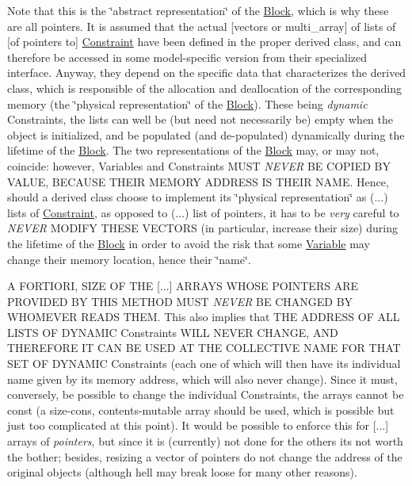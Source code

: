 Note that this is the \char`\"{}abstract representation\char`\"{} of the \mbox{\hyperlink{class_s_m_spp__di__unipi__it_1_1_block}{Block}}, which is why these are all pointers. It is assumed that the actual \mbox{[}vectors or multi\+\_\+array\mbox{]} of lists of \mbox{[}of pointers to\mbox{]} \mbox{\hyperlink{class_s_m_spp__di__unipi__it_1_1_constraint}{Constraint}} have been defined in the proper derived class, and can therefore be accessed in some model-\/specific version from their specialized interface. Anyway, they depend on the specific data that characterizes the derived class, which is responsible of the allocation and deallocation of the corresponding memory (the \char`\"{}physical representation\char`\"{} of the \mbox{\hyperlink{class_s_m_spp__di__unipi__it_1_1_block}{Block}}). These being {\itshape dynamic} Constraints, the lists can well be (but need not necessarily be) empty when the object is initialized, and be populated (and de-\/populated) dynamically during the lifetime of the \mbox{\hyperlink{class_s_m_spp__di__unipi__it_1_1_block}{Block}}. The two representations of the \mbox{\hyperlink{class_s_m_spp__di__unipi__it_1_1_block}{Block}} may, or may not, coincide\+: however, Variables and Constraints M\+U\+ST {\itshape N\+E\+V\+ER} BE C\+O\+P\+I\+ED BY V\+A\+L\+UE, B\+E\+C\+A\+U\+SE T\+H\+E\+IR M\+E\+M\+O\+RY A\+D\+D\+R\+E\+SS IS T\+H\+E\+IR N\+A\+ME. Hence, should a derived class choose to implement its \char`\"{}physical representation\char`\"{} as (...) lists of \mbox{\hyperlink{class_s_m_spp__di__unipi__it_1_1_constraint}{Constraint}}, as opposed to (...) list of pointers, it has to be {\itshape very} careful to {\itshape N\+E\+V\+ER} M\+O\+D\+I\+FY T\+H\+E\+SE V\+E\+C\+T\+O\+RS (in particular, increase their size) during the lifetime of the \mbox{\hyperlink{class_s_m_spp__di__unipi__it_1_1_block}{Block}} in order to avoid the risk that some \mbox{\hyperlink{class_s_m_spp__di__unipi__it_1_1_variable}{Variable}} may change their memory location, hence their \char`\"{}name\char`\"{}.

A F\+O\+R\+T\+I\+O\+RI, S\+I\+ZE OF T\+HE \mbox{[}...\mbox{]} A\+R\+R\+A\+YS W\+H\+O\+SE P\+O\+I\+N\+T\+E\+RS A\+RE P\+R\+O\+V\+I\+D\+ED BY T\+H\+IS M\+E\+T\+H\+OD M\+U\+ST {\itshape N\+E\+V\+ER} BE C\+H\+A\+N\+G\+ED BY W\+H\+O\+M\+E\+V\+ER R\+E\+A\+DS T\+H\+EM. This also implies that T\+HE A\+D\+D\+R\+E\+SS OF A\+LL L\+I\+S\+TS OF D\+Y\+N\+A\+M\+IC Constraints W\+I\+LL N\+E\+V\+ER C\+H\+A\+N\+GE, A\+ND T\+H\+E\+R\+E\+F\+O\+RE IT C\+AN BE U\+S\+ED AT T\+HE C\+O\+L\+L\+E\+C\+T\+I\+VE N\+A\+ME F\+OR T\+H\+AT S\+ET OF D\+Y\+N\+A\+M\+IC Constraints (each one of which will then have its individual name given by its memory address, which will also never change). Since it must, conversely, be possible to change the individual Constraints, the arrays cannot be const (a size-\/cons, contents-\/mutable array should be used, which is possible but just too complicated at this point). It would be possible to enforce this for \mbox{[}...\mbox{]} arrays of {\itshape pointers}, but since it is (currently) not done for the others it\textquotesingle{}s not worth the bother; besides, resizing a vector of pointers do not change the address of the original objects (although hell may break loose for many other reasons).

